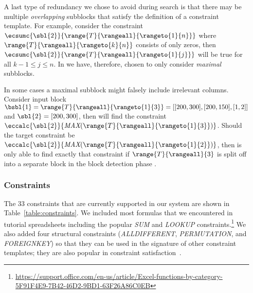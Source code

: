 A last type of redundancy we chose to avoid during search is that there may be multiple \textit{overlapping} subblocks that satisfy the definition of a constraint template.
For example, consider the constraint $\ecsumc{\sbl{2}}{\range{T}{\rangeall}{\rangeto{1}{n}}}$ where $\range{T}{\rangeall}{\rangeto{k}{n}}$ consists of only zeros, then $\ecsumc{\sbl{2}}{\range{T}{\rangeall}{\rangeto{1}{j}}}$ will be true for all $k - 1 \leq j \leq n$.
In \sname we have, therefore, chosen to only consider \textit{maximal} subblocks.

In some cases a maximal subblock might falsely include irrelevant columns.
Consider input block $\bsbl{1} = \range{T}{\rangeall}{\rangeto{1}{3}} = [[200, 300], [200, 150], [1, 2]]$ and $\sbl{2} = [200, 300]$, then \sname will find the constraint $\eccalc{\sbl{2}}{\textit{MAX}(\range{T}{\rangeall}{\rangeto{1}{3}})}$.
Should the target constraint be $\eccalc{\sbl{2}}{\textit{MAX}(\range{T}{\rangeall}{\rangeto{1}{2}})}$, then \sname is only able to find exactly that constraint if $\range{T}{\rangeall}{3}$ is split off into a separate block in the block detection phase .






\subsubsection{Constraints}
\label{sec:which_cons}
The 33 constraints that are currently supported in our system are shown in Table~\ref{table:constraints}.
We included most formulas that we encountered in tutorial spreadsheets including the popular \textit{SUM} and \textit{LOOKUP} constraints.\!\footnote{\href{https://support.office.com/en-us/article/Excel-functions-by-category-5F91F4E9-7B42-46D2-9BD1-63F26A86C0EB}{https://support.office.com/en-us/article/Excel-functions-by-category-5F91F4E9-7B42-46D2-9BD1-63F26A86C0EB}}
We also added four structural constraints (\textit{ALLDIFFERENT}, \textit{PERMUTATION}, \textit{\ecascname} and \textit{FOREIGNKEY}) so that they can be used in the signature of other constraint templates; they are also popular in constraint satisfaction~\cite{modelseeker}.


